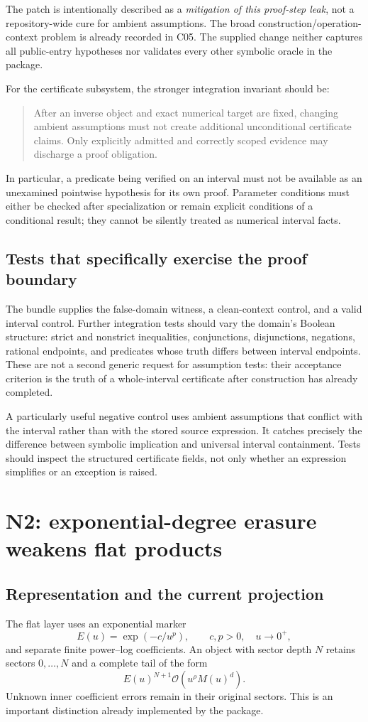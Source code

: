 \documentclass[11pt,letterpaper]{article}
\newcommand{\OO}{\mathcal O}
\begin{document}
The patch is intentionally described as a \emph{mitigation of this proof-step
leak}, not a repository-wide cure for ambient assumptions. The broad
construction/operation-context problem is already recorded in C05. The supplied
change neither captures all public-entry hypotheses nor validates every other
symbolic oracle in the package.

For the certificate subsystem, the stronger integration invariant should be:
\begin{quote}
After an inverse object and exact numerical target are fixed, changing ambient
assumptions must not create additional unconditional certificate claims.
Only explicitly admitted and correctly scoped evidence may discharge a proof
obligation.
\end{quote}
In particular, a predicate being verified on an interval must not be available
as an unexamined pointwise hypothesis for its own proof. Parameter conditions
must either be checked after specialization or remain explicit conditions of a
conditional result; they cannot be silently treated as numerical interval facts.

\subsection{Tests that specifically exercise the proof boundary}
The bundle supplies the false-domain witness, a clean-context control, and a
valid interval control. Further integration tests should vary the domain's
Boolean structure: strict and nonstrict inequalities, conjunctions,
disjunctions, negations, rational endpoints, and predicates whose truth differs
between interval endpoints. These are not a second generic request for
assumption tests: their acceptance criterion is the truth of a whole-interval
certificate after construction has already completed.

A particularly useful negative control uses ambient assumptions that conflict
with the interval rather than with the stored source expression. It catches
precisely the difference between symbolic implication and universal interval
containment. Tests should inspect the structured certificate fields, not only
whether an expression simplifies or an exception is raised.

\section{N2: exponential-degree erasure weakens flat products}
\label{sec:n2}
\subsection{Representation and the current projection}
The flat layer uses an exponential marker
\[
 E(u)=\exp(-c/u^p),\qquad c,p>0,\quad u\to0^+,
\]
and separate finite power--log coefficients. An object with sector depth $N$
retains sectors $0,\ldots,N$ and a complete tail of the form
\[
 E(u)^{N+1}\OO\!\left(u^\rho M(u)^d\right).
\]
Unknown inner coefficient errors remain in their original sectors. This is
an important distinction already implemented by the package.\cite{flat,flatops}
\end{document}
